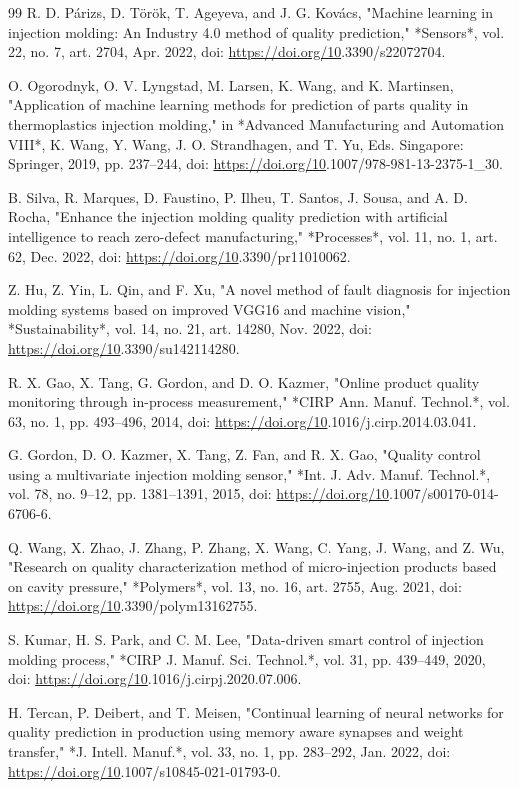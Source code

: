 \begin{thebibliography}{99}
 R. D. Párizs, D. Török, T. Ageyeva, and J. G. Kovács, "Machine learning in injection molding: An Industry 4.0 method of quality prediction," *Sensors*, vol. 22, no. 7, art. 2704, Apr. 2022, doi: \url{https://doi.org/10}.3390/s22072704.

 O. Ogorodnyk, O. V. Lyngstad, M. Larsen, K. Wang, and K. Martinsen, "Application of machine learning methods for prediction of parts quality in thermoplastics injection molding," in *Advanced Manufacturing and Automation VIII*, K. Wang, Y. Wang, J. O. Strandhagen, and T. Yu, Eds. Singapore: Springer, 2019, pp. 237–244, doi: \url{https://doi.org/10}.1007/978-981-13-2375-1\_30.

 B. Silva, R. Marques, D. Faustino, P. Ilheu, T. Santos, J. Sousa, and A. D. Rocha, "Enhance the injection molding quality prediction with artificial intelligence to reach zero-defect manufacturing," *Processes*, vol. 11, no. 1, art. 62, Dec. 2022, doi: \url{https://doi.org/10}.3390/pr11010062.

 Z. Hu, Z. Yin, L. Qin, and F. Xu, "A novel method of fault diagnosis for injection molding systems based on improved VGG16 and machine vision," *Sustainability*, vol. 14, no. 21, art. 14280, Nov. 2022, doi: \url{https://doi.org/10}.3390/su142114280.

 R. X. Gao, X. Tang, G. Gordon, and D. O. Kazmer, "Online product quality monitoring through in-process measurement," *CIRP Ann. Manuf. Technol.*, vol. 63, no. 1, pp. 493–496, 2014, doi: \url{https://doi.org/10}.1016/j.cirp.2014.03.041.

 G. Gordon, D. O. Kazmer, X. Tang, Z. Fan, and R. X. Gao, "Quality control using a multivariate injection molding sensor," *Int. J. Adv. Manuf. Technol.*, vol. 78, no. 9–12, pp. 1381–1391, 2015, doi: \url{https://doi.org/10}.1007/s00170-014-6706-6.

 Q. Wang, X. Zhao, J. Zhang, P. Zhang, X. Wang, C. Yang, J. Wang, and Z. Wu, "Research on quality characterization method of micro-injection products based on cavity pressure," *Polymers*, vol. 13, no. 16, art. 2755, Aug. 2021, doi: \url{https://doi.org/10}.3390/polym13162755.

 S. Kumar, H. S. Park, and C. M. Lee, "Data-driven smart control of injection molding process," *CIRP J. Manuf. Sci. Technol.*, vol. 31, pp. 439–449, 2020, doi: \url{https://doi.org/10}.1016/j.cirpj.2020.07.006.

 H. Tercan, P. Deibert, and T. Meisen, "Continual learning of neural networks for quality prediction in production using memory aware synapses and weight transfer," *J. Intell. Manuf.*, vol. 33, no. 1, pp. 283–292, Jan. 2022, doi: \url{https://doi.org/10}.1007/s10845-021-01793-0.


\end{thebibliography}
